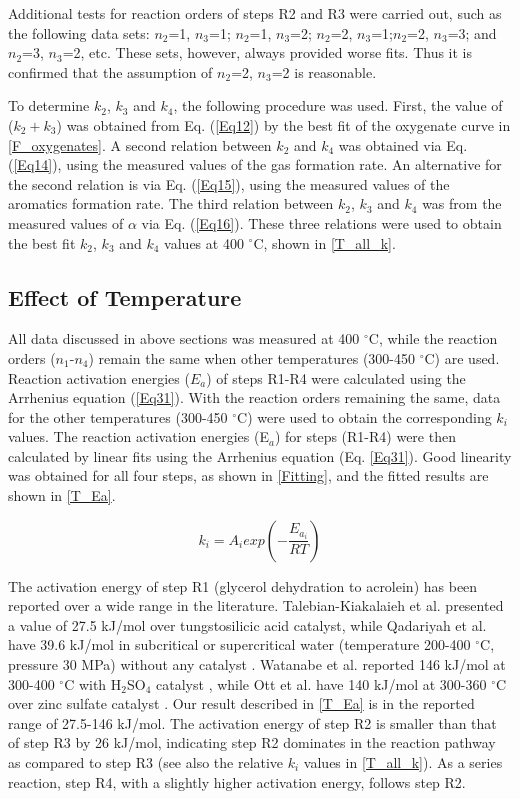 \documentclass[journal=iecred,manuscript=article]{achemso}
\begin{document}
Additional tests for reaction orders of steps R2 and R3 were carried out,
such as the following data sets:
$n_2$=1, $n_3$=1; $n_2$=1, $n_3$=2; $n_2$=2, $n_3$=1;$n_2$=2, $n_3$=3; and $n_2$=3, $n_3$=2, etc.
These sets, however, always provided worse fits. Thus it is confirmed that the assumption of $n_2$=2, $n_3$=2 is reasonable.

To determine $k_2$, $k_3$ and $k_4$,
the following procedure was used. 
First, the value of ($k_2+k_3$) was obtained from Eq. (\ref{Eq12}) by the best fit of the oxygenate curve in \ref{F_oxygenates}.
A second relation between $k_2$ and $k_4$ was obtained via Eq. (\ref{Eq14}), using the measured values of the gas formation rate.
An alternative for the second relation is via Eq. (\ref{Eq15}), using the measured values of the aromatics formation rate.
The third relation between $k_2$, $k_3$ and $k_4$ was from the measured values of $\alpha$ via Eq. (\ref{Eq16}).
These three relations were used to obtain the best fit $k_2$, $k_3$ and $k_4$ values at 400 $^{\circ}$C, shown in \ref{T_all_k}.   

\subsection{Effect of Temperature} 

All data discussed in above sections was measured at 400 $^{\circ}$C,
while the reaction orders ($n_1$-$n_4$) remain the same when other temperatures (300-450 $^{\circ}$C) are used.
Reaction activation energies ($E_a$) of steps R1-R4 were calculated using the Arrhenius equation (\ref{Eq31}).
With the reaction orders remaining the same,
data for the other temperatures (300-450 $^{\circ}$C) were used to obtain the corresponding $k_i$ values.
The reaction activation energies (E$_a$) for steps (R1-R4) were then calculated by linear fits using the Arrhenius equation (Eq. \ref{Eq31}).
Good linearity was obtained for all four steps, as shown in \ref{Fitting}, and the fitted results are shown in \ref{T_Ea}. 

\begin{equation} \label{Eq31}
k_i=A_iexp\left(-\frac{E_{a_{i}}}{RT}\right)
\end{equation}

The activation energy of step R1 (glycerol dehydration to acrolein) has been reported over a wide range in the literature.
Talebian-Kiakalaieh et al. presented a value of 27.5 kJ/mol over tungstosilicic acid catalyst\cite{Talebian-Kiakalaieh2015},
while Qadariyah et al. have 39.6 kJ/mol in subcritical or supercritical water (temperature 200-400 $^{\circ}$C, pressure 30 MPa) without any catalyst \cite{Qadariyah2011}.
Watanabe et al. reported 146 kJ/mol at 300-400 $^{\circ}$C with H$_2$SO$_4$ catalyst \cite{Watanabe2007},
while Ott et al. have 140 kJ/mol at 300-360 $^{\circ}$C over zinc sulfate catalyst \cite{Ott2006}.
Our result described in \ref{T_Ea} is in the reported range of 27.5-146 kJ/mol.
The activation energy of step R2 is smaller than that of step R3 by 26 kJ/mol, 
indicating step R2 dominates in the reaction pathway as compared to step R3 (see also the relative $k_i$ values in \ref{T_all_k}).
As a series reaction, step R4, with a slightly higher activation energy, follows step R2.
\end{document}
